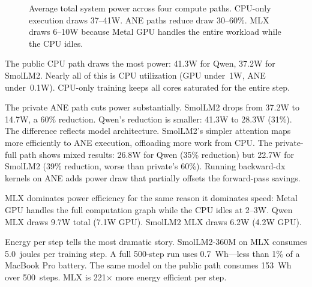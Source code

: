 \documentclass[11pt]{article}
\begin{document}
\begin{figure}[t]
\centering
{}
\caption{Average total system power across four compute paths.  CPU-only execution draws 37--41W.  ANE paths reduce draw 30--60\%.  MLX draws 6--10W because Metal GPU handles the entire workload while the CPU idles.}
\label{fig:power}
\end{figure}

The public CPU path draws the most power: 41.3W for Qwen, 37.2W for SmolLM2.  Nearly all of this is CPU utilization (GPU under~1W, ANE under~0.1W).  CPU-only training keeps all cores saturated for the entire step.

The private ANE path cuts power substantially.  SmolLM2 drops from 37.2W to 14.7W, a 60\% reduction.  Qwen's reduction is smaller: 41.3W to 28.3W (31\%).  The difference reflects model architecture.  SmolLM2's simpler attention maps more efficiently to ANE execution, offloading more work from CPU.  The private-full path shows mixed results: 26.8W for Qwen (35\% reduction) but 22.7W for SmolLM2 (39\% reduction, worse than private's 60\%).  Running backward-dx kernels on ANE adds power draw that partially offsets the forward-pass savings.

MLX dominates power efficiency for the same reason it dominates speed: Metal GPU handles the full computation graph while the CPU idles at 2--3W.  Qwen MLX draws 9.7W total (7.1W GPU).  SmolLM2 MLX draws 6.2W (4.2W GPU).

Energy per step tells the most dramatic story.  SmolLM2-360M on MLX consumes 5.0~joules per training step.  A full 500-step run uses 0.7~Wh---less than 1\% of a MacBook Pro battery.  The same model on the public path consumes 153~Wh over 500~steps.  MLX is 221$\times$ more energy efficient per step.
\end{document}
